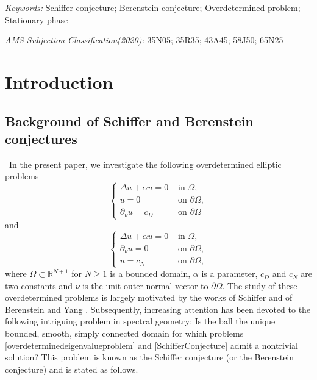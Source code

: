 \documentclass[12pt]{article}
\numberwithin{equation}{section}
\numberwithin{equation}{section}
\begin{document}
\emph{Keywords:} Schiffer conjecture; Berenstein conjecture; Overdetermined problem; Stationary phase


\emph{AMS Subjection Classification(2020):} 35N05; 35R35; 43A45; 58J50; 65N25

\tableofcontents


\section{Introduction}
\subsection{Background of Schiffer and Berenstein conjectures}
\bigskip
\quad\,
In the present paper, we investigate the following overdetermined elliptic problems
\begin{equation}\label{overdeterminedeigenvalueproblem}
\left\{
\begin{array}{ll}
\Delta u+\alpha u=0\,\, &\text{in}\,\, \Omega,\\
u=0 &\text{on}\,\, \partial \Omega,\\
\partial_\nu u=c_{D} &\text{on}\,\, \partial \Omega
\end{array}
\right.
\end{equation}
and
\begin{equation}\label{SchifferConjecture}
\left\{
\begin{array}{ll}
\Delta u+\alpha u=0\,\, &\text{in}\,\, \Omega,\\
\partial_\nu u=0 &\text{on}\,\, \partial \Omega,\\
u=c_{N} &\text{on}\,\, \partial \Omega,
\end{array}
\right.
\end{equation}
where $\Omega\subset \mathbb{R}^{N+1}$ for $N\geq 1$ is a bounded domain, $\alpha$ is a parameter, $c_D$ and $c_N$ are two constants and $\nu$ is the unit outer normal vector to $\partial \Omega$.
The study of these overdetermined problems is largely motivated by the works of Schiffer \cite{Schiffer,Schiffer1} and of Berenstein and Yang \cite{Berenstein, Berenstein1, Berenstein2}. Subsequently, increasing attention has been devoted to the following intriguing problem in spectral geometry: Is the ball the unique bounded, smooth, simply connected domain for which problems \eqref{overdeterminedeigenvalueproblem} and \eqref{SchifferConjecture} admit a nontrivial solution? This problem is known as the Schiffer conjecture \cite[Problem 80]{Yau}(or the Berenstein conjecture) and is stated as follows.
\end{document}

